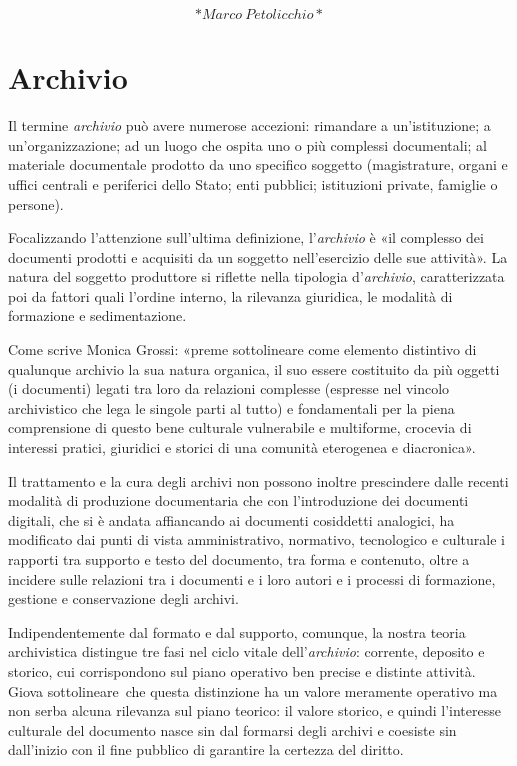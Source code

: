 \documentclass[
  b5paper,
  twoside,
  12pt,
  chapterprefix=false,
  bibliography=totocnumbered,
  parskip=false]{scrbook}
\begin{document}
\[*Marco~Petolicchio*\]

\hypertarget{archivio}{%
\chapter{Archivio}\label{archivio}}

Il termine \emph{archivio} può avere numerose accezioni: rimandare a
un'istituzione; a un'organizzazione; ad un luogo che ospita uno o più
complessi documentali; al materiale documentale prodotto da uno
specifico soggetto (magistrature, organi e uffici centrali e periferici
dello Stato; enti pubblici; istituzioni private, famiglie o persone).

Focalizzando l'attenzione sull'ultima definizione, l'\emph{archivio} è «il
complesso dei documenti prodotti e acquisiti da un soggetto
nell'esercizio delle sue attività». La natura del soggetto produttore si
riflette nella tipologia d'\emph{archivio}, caratterizzata poi da fattori
quali l'ordine interno, la rilevanza giuridica, le modalità di
formazione e sedimentazione.

Come scrive Monica Grossi: «preme sottolineare come elemento distintivo
di qualunque archivio la sua natura organica, il suo essere costituito
da più oggetti (i documenti) legati tra loro da relazioni complesse
(espresse nel vincolo archivistico che lega le singole parti al tutto) e
fondamentali per la piena comprensione di questo bene culturale
vulnerabile e multiforme, crocevia di interessi pratici, giuridici e
storici di una comunità eterogenea e diacronica».

Il trattamento e la cura degli archivi non possono inoltre prescindere
dalle recenti modalità di produzione documentaria che con l'introduzione
dei documenti digitali, che si è andata affiancando ai documenti
cosiddetti analogici, ha modificato dai punti di vista amministrativo,
normativo, tecnologico e culturale i rapporti tra supporto e testo del
documento, tra forma e contenuto, oltre a incidere sulle relazioni tra i
documenti e i loro autori e i processi di formazione, gestione e
conservazione degli archivi.

Indipendentemente dal formato e dal supporto, comunque, la nostra teoria
archivistica distingue tre fasi nel ciclo vitale dell'\emph{archivio}:
corrente, deposito e storico, cui corrispondono sul piano operativo ben
precise e distinte attività. Giova sottolineare~che questa distinzione
ha un valore meramente operativo ma non serba alcuna rilevanza sul piano
teorico: il valore storico, e quindi l'interesse culturale del documento
nasce sin dal formarsi degli archivi e coesiste sin dall'inizio con il
fine pubblico di garantire la certezza del diritto.
\end{document}
